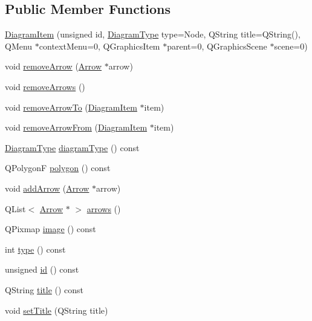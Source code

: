 \subsection*{Public Member Functions}
\begin{DoxyCompactItemize}
\item 
\hyperlink{class_diagram_item_a3af966b3d7ad8f8d431f997da431a946}{DiagramItem} (unsigned id, \hyperlink{class_diagram_item_aeda67bf28fac9b4de77086c2bf81407b}{DiagramType} type=Node, QString title=QString(), QMenu $\ast$contextMenu=0, QGraphicsItem $\ast$parent=0, QGraphicsScene $\ast$scene=0)
\item 
void \hyperlink{class_diagram_item_af85bfb4edd1f641fae6b605e4bb529b4}{removeArrow} (\hyperlink{class_arrow}{Arrow} $\ast$arrow)
\item 
void \hyperlink{class_diagram_item_ade8fc7eb5fc8795ed32088b9d84d8e79}{removeArrows} ()
\item 
void \hyperlink{class_diagram_item_afa82238c3911ca2dc627677363e9e7aa}{removeArrowTo} (\hyperlink{class_diagram_item}{DiagramItem} $\ast$item)
\item 
void \hyperlink{class_diagram_item_a674530ed70fb40da3bdf021f3375be8f}{removeArrowFrom} (\hyperlink{class_diagram_item}{DiagramItem} $\ast$item)
\item 
\hyperlink{class_diagram_item_aeda67bf28fac9b4de77086c2bf81407b}{DiagramType} \hyperlink{class_diagram_item_ac48041aae81c7672834b2cbaf24c7e34}{diagramType} () const 
\item 
QPolygonF \hyperlink{class_diagram_item_a483cb2a13c9035090ef55bfa148fc93c}{polygon} () const 
\item 
void \hyperlink{class_diagram_item_a7eea98dfc6ec8956e0fb0e6e440fdcb0}{addArrow} (\hyperlink{class_arrow}{Arrow} $\ast$arrow)
\item 
QList$<$ \hyperlink{class_arrow}{Arrow} $\ast$ $>$ \hyperlink{class_diagram_item_afe617f472ab53710831e6b21339fd80b}{arrows} ()
\item 
QPixmap \hyperlink{class_diagram_item_a355f5719b096dbb89375a54be2ee3890}{image} () const 
\item 
int \hyperlink{class_diagram_item_a4851c7c4ea5fbb3e137c074082ebf84b}{type} () const 
\item 
unsigned \hyperlink{class_diagram_item_ae27107e6ff40337638aaed4f23f9db1f}{id} () const 
\item 
QString \hyperlink{class_diagram_item_aa9a36460047547dd1715403c09e297a6}{title} () const 
\item 
void \hyperlink{class_diagram_item_a968952bdd84bad5ae6f5c6b7b8ed82b0}{setTitle} (QString title)
\end{DoxyCompactItemize}
